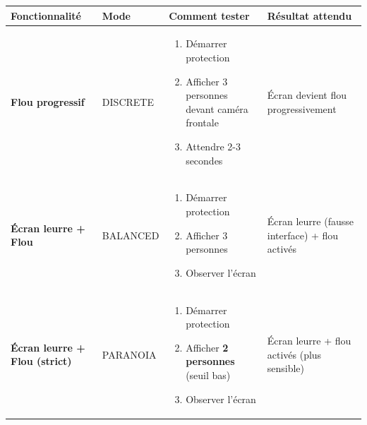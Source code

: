 \documentclass[11pt,a4paper]{article}
\begin{document}
\begin{center}
\begin{tabular}{p{3.5cm}p{2cm}p{6cm}p{3cm}}
\toprule
\textbf{Fonctionnalité} & \textbf{Mode} & \textbf{Comment tester} & \textbf{Résultat attendu}\\
\midrule

\textbf{Flou progressif} & DISCRETE & 
\begin{minipage}[t]{6cm}
\vspace{-2mm}
\begin{enumerate}[leftmargin=*,topsep=0pt]
    \item Démarrer protection
    \item Afficher 3 personnes devant caméra frontale
    \item Attendre 2-3 secondes
\end{enumerate}
\vspace{-2mm}
\end{minipage} & 
Écran devient flou progressivement \\

\midrule

\textbf{Écran leurre + Flou} & BALANCED & 
\begin{minipage}[t]{6cm}
\vspace{-2mm}
\begin{enumerate}[leftmargin=*,topsep=0pt]
    \item Démarrer protection
    \item Afficher 3 personnes
    \item Observer l'écran
\end{enumerate}
\vspace{-2mm}
\end{minipage} & 
Écran leurre (fausse interface) + flou activés \\

\midrule

\textbf{Écran leurre + Flou (strict)} & PARANOIA & 
\begin{minipage}[t]{6cm}
\vspace{-2mm}
\begin{enumerate}[leftmargin=*,topsep=0pt]
    \item Démarrer protection
    \item Afficher \textbf{2 personnes} (seuil bas)
    \item Observer l'écran
\end{enumerate}
\vspace{-2mm}
\end{minipage} & 
Écran leurre + flou activés (plus sensible) \\


\end{tabular}
\end{center}
\end{document}
